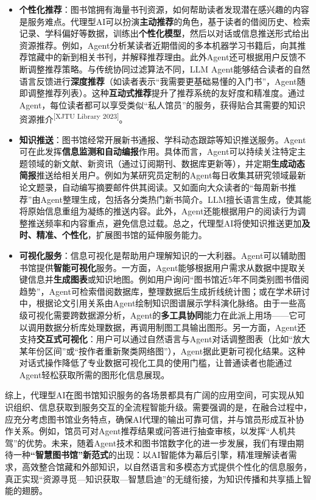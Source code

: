 \documentclass[
  letterpaper,
]{scrbook}
\begin{document}
\begin{itemize}
\item
  \textbf{个性化推荐}：图书馆拥有海量书刊资源，如何帮助读者发现潜在感兴趣的内容是服务难点。代理型AI可以扮演\textbf{主动推荐}的角色，基于读者的借阅历史、检索记录、学科偏好等数据，训练出\textbf{个性化模型}，然后以对话或信息推送形式给出资源推荐。例如，Agent分析某读者近期借阅的多本机器学习书籍后，向其推荐馆藏中的新到相关书刊，并解释推荐理由。此外Agent还可根据用户反馈不断调整推荐策略。与传统协同过滤算法不同，LLM
  Agent能够结合读者的自然语言反馈进行\textbf{深度推荐}（如读者表示``我需要更基础易懂的入门书''，Agent随即调整推荐列表）。这种\textbf{互动式推荐}提升了推荐系统的友好度和精准度。通过Agent，每位读者都可以享受类似``私人馆员''的服务，获得贴合其需要的知识资源推介\textsuperscript{{[}XJTU
  Library 2023{]}}。
\item
  \textbf{知识推送}：图书馆经常开展新书通报、学科动态跟踪等知识推送服务。Agent可在此发挥\textbf{信息监测和自动编报}作用。具体而言，Agent可以持续关注特定主题领域的新文献、新资讯（通过订阅期刊、数据库更新等），并定期\textbf{生成动态简报}推送给相关用户。例如为某研究员定制的Agent每日收集其研究领域最新论文题录，自动编写摘要邮件供其阅读。又如面向大众读者的``每周新书推荐''由Agent整理生成，包括各分类热门新书简介。LLM擅长语言生成，使其能将原始信息重组为凝练的推送内容。此外，Agent还能根据用户的阅读行为调整推送频率和内容重点，避免信息过载。总之，代理型AI将使知识推送更加\textbf{及时、精准、个性化}，扩展图书馆的延伸服务能力。
\item
  \textbf{可视化服务}：信息可视化是帮助用户理解知识的一大利器。Agent可以辅助图书馆提供\textbf{智能可视化}服务。一方面，Agent能够根据用户需求从数据中提取关键信息并\textbf{生成图表}或知识地图。例如用户询问``图书馆近5年不同类别图书借阅趋势''，Agent可检索借阅数据库，整理数据后生成折线统计图；或在学术研讨中，根据论文引用关系由Agent绘制知识图谱展示学科演化脉络。由于一些高级可视化需要跨数据源分析，Agent的\textbf{多工具协同}能力在此派上用场------它可以调用数据分析库处理数据，再调用制图工具输出图形。另一方面，Agent还支持\textbf{交互式可视化}：用户可以通过自然语言与Agent对话调整图表（比如``放大某年份区间''或``按作者重新聚类网络图''），Agent据此更新可视化结果。这种对话式操作降低了专业数据可视化工具的使用门槛，让普通读者也能通过Agent轻松获取所需的图形化信息展现。
\end{itemize}

综上，代理型AI在图书馆知识服务的各场景都具有广阔的应用空间，可实现从知识组织、信息获取到服务交互的全流程智能升级。需要强调的是，在融合过程中，应充分考虑图书馆业务特点，确保AI代理的输出可靠可信，并与馆员形成互补协作关系。例如，馆员可对Agent推荐结果或问答进行抽查审核，以发挥``人机共驾''的优势。未来，随着Agent技术和图书馆数字化的进一步发展，我们有理由期待一种\textbf{``智慧图书馆''新范式}的出现：以AI智能体为幕后引擎，精准理解读者需求，高效整合馆藏和外部知识，以自然语言和多模态方式提供个性化的信息服务，真正实现``资源寻觅---知识获取---智慧启迪''的无缝衔接，为知识传播和共享插上智能的翅膀。
\end{document}
